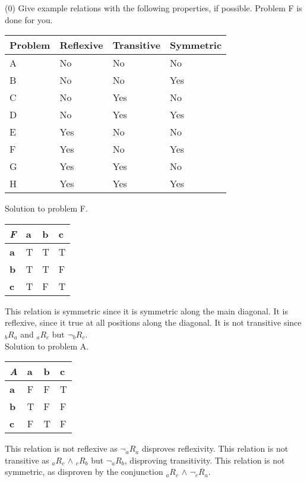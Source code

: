 \documentclass{article}
\begin{document}
(0) Give example relations with the following properties, if possible. Problem F is done for you.

\begin{center}
\begin{tabular}{ | l | l | l | l | }
\hline
\textbf{Problem} & \textbf{Reflexive} & \textbf{Transitive} & \textbf{Symmetric}\\
\hline
A  & No  & No & No\\
\hline
B & No & No & Yes\\
\hline
C & No & Yes & No\\
\hline 
D & No & Yes & Yes\\
\hline
E & Yes & No & No\\
\hline
F & Yes & No & Yes\\
\hline
G & Yes & Yes & No\\
\hline
H & Yes & Yes & Yes\\
\hline
\end{tabular}
\end{center}

Solution to problem F.
\begin{center}
\begin{tabular}{ | l | l | l | l | }
\hline
\textit{\textbf{F}} & \textbf{a} & \textbf{b} & \textbf{c}\\
\hline
\textbf{a}  & T  & T & T\\
\hline
\textbf{b} & T & T & F\\
\hline
\textbf{c} & T & F & T\\
\hline 
\end{tabular}
\end{center}

This relation is symmetric since it is symmetric along the main diagonal. It is reflexive, since it true at all positions along the diagonal. It is not transitive since $_bR_a$ and $_aR_c$ but $\neg_bR_c$.\\

Solution to problem A.
\begin{center}
\begin{tabular}{ | l | l | l | l | }
\hline
\textit{\textbf{A}} & \textbf{a} & \textbf{b} & \textbf{c}\\
\hline
\textbf{a}  & F  & F & T\\
\hline
\textbf{b} & T & F & F\\
\hline
\textbf{c} & F & T & F\\
\hline 
\end{tabular}
\end{center}

This relation is not reflexive as $\neg_aR_a$ disproves reflexivity. This relation is not transitive as $_aR_c$ $\wedge$ $_cR_b$ but $\neg_aR_b$, disproving transitivity. This relation is not symmetric, as disproven by the conjunction $_aR_c$ $\wedge$ $\neg_cR_a$.
\end{document}
